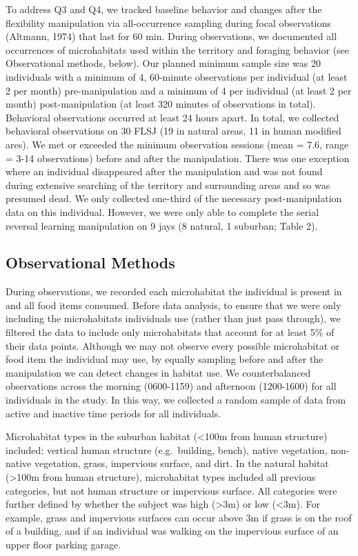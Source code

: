 \documentclass[
]{article}
\begin{document}
To address Q3 and Q4, we tracked baseline behavior and changes after the
flexibility manipulation via all-occurrence sampling during focal
observations (Altmann, 1974) that last for 60 min. During observations,
we documented all occurrences of microhabitats used within the territory
and foraging behavior (see Observational methods, below). Our planned
minimum sample size was 20 individuals with a minimum of 4, 60-minute
observations per individual (at least 2 per month) pre-manipulation and
a minimum of 4 per individual (at least 2 per month) post-manipulation
(at least 320 minutes of observations in total). Behavioral observations
occurred at least 24 hours apart. In total, we collected behavioral
observations on 30 FLSJ (19 in natural areas, 11 in human modified
ares). We met or exceeded the minimum observation sessions (mean = 7.6,
range = 3-14 observations) before and after the manipulation. There was
one exception where an individual disappeared after the manipulation and
was not found during extensive searching of the territory and
surrounding areas and so was presumed dead. We only collected one-third
of the necessary post-manipulation data on this individual. However, we
were only able to complete the serial reversal learning manipulation on
9 jays (8 natural, 1 suburban; Table 2).

\subsection{Observational Methods}\label{observational-methods}

During observations, we recorded each microhabitat the individual is
present in and all food items consumed. Before data analysis, to ensure
that we were only including the microhabitats individuals use (rather
than just pass through), we filtered the data to include only
microhabitats that account for at least 5\% of their data points.
Although we may not observe every possible microhabitat or food item the
individual may use, by equally sampling before and after the
manipulation we can detect changes in habitat use. We counterbalanced
observations across the morning (0600-1159) and afternoon (1200-1600)
for all individuals in the study. In this way, we collected a random
sample of data from active and inactive time periods for all
individuals.

Microhabitat types in the suburban habitat (\textless100m from human
structure) included: vertical human structure (e.g.~building, bench),
native vegetation, non-native vegetation, grass, impervious surface, and
dirt. In the natural habitat (\textgreater100m from human structure),
microhabitat types included all previous categories, but not human
structure or impervious surface. All categories were further defined by
whether the subject was high (\textgreater3m) or low (\textless3m). For
example, grass and impervious surfaces can occur above 3m if grass is on
the roof of a building, and if an individual was walking on the
impervious surface of an upper floor parking garage.
\end{document}
